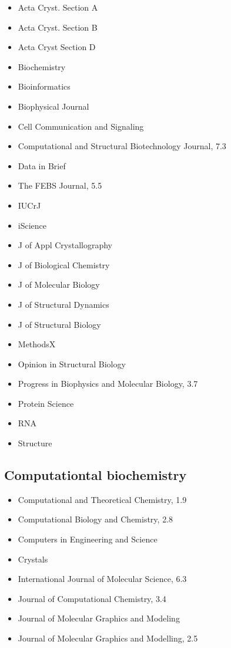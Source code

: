 \documentclass[11pt,letterpaper]{article}
\begin{document}
\begin{itemize}
\item Acta Cryst. Section A
\item Acta Cryst. Section B
\item Acta Cryst Section D
\item Biochemistry
\item Bioinformatics
\item Biophysical Journal
\item Cell Communication and Signaling
\item Computational and Structural Biotechnology Journal, 7.3
\item Data in Brief
\item The FEBS Journal, 5.5
\item IUCrJ
\item iScience
\item J of Appl Crystallography
\item J of Biological Chemistry
\item J of Molecular Biology
\item J of Structural Dynamics
\item J of Structural Biology
\item MethodsX
\item Opinion in Structural Biology
\item Progress in Biophysics and Molecular Biology, 3.7
\item Protein Science
\item RNA
\item Structure
\end{itemize}


\subsection{Computationtal biochemistry}
\label{sec:org0fd1f3f}

\begin{itemize}
\item Computational and Theoretical Chemistry, 1.9
\item Computational Biology and Chemistry, 2.8
\item Computers in Engineering and Science
\item Crystals
\item International Journal of Molecular Science, 6.3
\item Journal of Computational Chemistry, 3.4
\item Journal of Molecular Graphics and Modeling
\item Journal of Molecular Graphics and Modelling, 2.5
\end{itemize}
\end{document}

